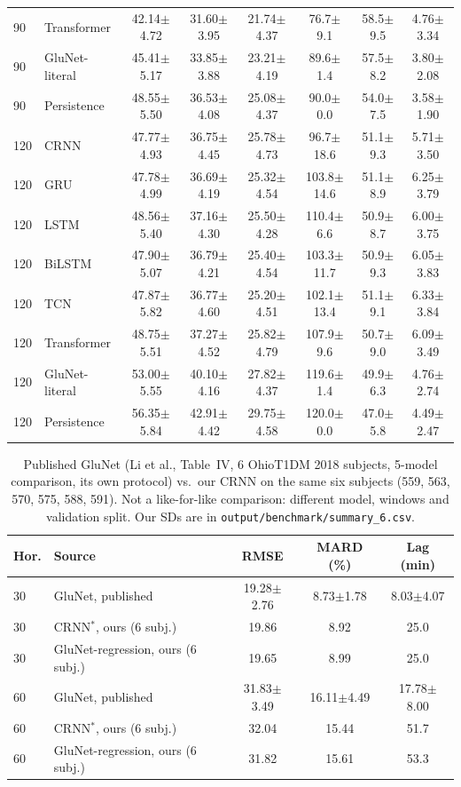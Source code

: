 \documentclass[conference]{IEEEtran}
\begin{document}
\begin{table}[t]
\begin{tabular}{llcccccc}
90 & Transformer & 42.14$\pm$4.72 & 31.60$\pm$3.95 & 21.74$\pm$4.37 & 76.7$\pm$9.1 & 58.5$\pm$9.5 & 4.76$\pm$3.34\\
90 & GluNet-literal & 45.41$\pm$5.17 & 33.85$\pm$3.88 & 23.21$\pm$4.19 & 89.6$\pm$1.4 & 57.5$\pm$8.2 & 3.80$\pm$2.08\\
90 & Persistence & 48.55$\pm$5.50 & 36.53$\pm$4.08 & 25.08$\pm$4.37 & 90.0$\pm$0.0 & 54.0$\pm$7.5 & 3.58$\pm$1.90\\
\midrule
120 & CRNN & 47.77$\pm$4.93 & 36.75$\pm$4.45 & 25.78$\pm$4.73 & 96.7$\pm$18.6 & 51.1$\pm$9.3 & 5.71$\pm$3.50\\
120 & GRU & 47.78$\pm$4.99 & 36.69$\pm$4.19 & 25.32$\pm$4.54 & 103.8$\pm$14.6 & 51.1$\pm$8.9 & 6.25$\pm$3.79\\
120 & LSTM & 48.56$\pm$5.40 & 37.16$\pm$4.30 & 25.50$\pm$4.28 & 110.4$\pm$6.6 & 50.9$\pm$8.7 & 6.00$\pm$3.75\\
120 & BiLSTM & 47.90$\pm$5.07 & 36.79$\pm$4.21 & 25.40$\pm$4.54 & 103.3$\pm$11.7 & 50.9$\pm$9.3 & 6.05$\pm$3.83\\
120 & TCN & 47.87$\pm$5.82 & 36.77$\pm$4.60 & 25.20$\pm$4.51 & 102.1$\pm$13.4 & 51.1$\pm$9.1 & 6.33$\pm$3.84\\
120 & Transformer & 48.75$\pm$5.51 & 37.27$\pm$4.52 & 25.82$\pm$4.79 & 107.9$\pm$9.6 & 50.7$\pm$9.0 & 6.09$\pm$3.49\\
120 & GluNet-literal & 53.00$\pm$5.55 & 40.10$\pm$4.16 & 27.82$\pm$4.37 & 119.6$\pm$1.4 & 49.9$\pm$6.3 & 4.76$\pm$2.74\\
120 & Persistence & 56.35$\pm$5.84 & 42.91$\pm$4.42 & 29.75$\pm$4.58 & 120.0$\pm$0.0 & 47.0$\pm$5.8 & 4.49$\pm$2.47\\
\bottomrule
\end{tabular}\end{table}
\begin{table}[t]\centering\caption{Published GluNet (Li et al., Table~IV, 6 OhioT1DM 2018 subjects, 5-model comparison, its own protocol) vs.\ our CRNN on the same six subjects (559, 563, 570, 575, 588, 591). Not a like-for-like comparison: different model, windows and validation split. Our SDs are in \texttt{output/benchmark/summary\_6.csv}.}
\small\begin{tabular}{llccc}\toprule
Hor. & Source & RMSE & MARD (\%) & Lag (min)\\\midrule
30 & GluNet, published & 19.28$\pm$2.76 & 8.73$\pm$1.78 & 8.03$\pm$4.07\\
30 & CRNN$^{*}$, ours (6 subj.) & 19.86 & 8.92 & 25.0\\
30 & GluNet-regression, ours (6 subj.) & 19.65 & 8.99 & 25.0\\
60 & GluNet, published & 31.83$\pm$3.49 & 16.11$\pm$4.49 & 17.78$\pm$8.00\\
60 & CRNN$^{*}$, ours (6 subj.) & 32.04 & 15.44 & 51.7\\
60 & GluNet-regression, ours (6 subj.) & 31.82 & 15.61 & 53.3\\\bottomrule
\end{tabular}\end{table}
\end{document}
